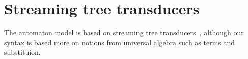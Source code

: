 


\section{Streaming tree transducers}
\label{sec:stt}
The automaton model is based on streaming tree transducers~\cite{alur2017streaming}, although our syntax is based more on notions from universal algebra such as terms and substituion.





